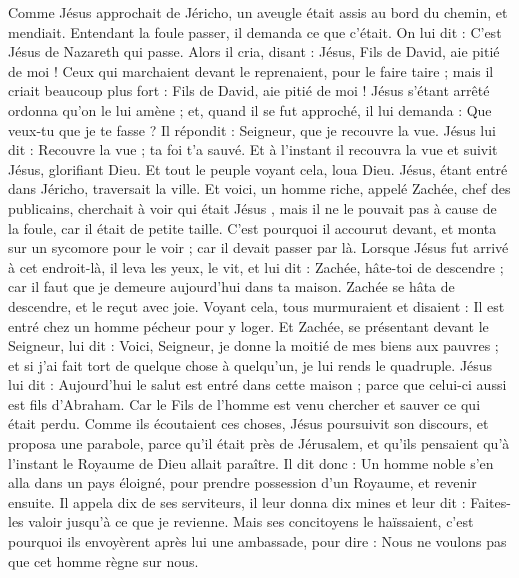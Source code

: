 \begin{multicols}{2}
{
Comme Jésus approchait de Jéricho, un aveugle était assis au bord du chemin, et mendiait.
Entendant la foule passer, il demanda ce que c'était.
On lui dit : C’est Jésus de Nazareth qui passe.
Alors il cria, disant : Jésus, Fils de David, aie pitié de moi !
Ceux qui marchaient devant le reprenaient, pour le faire taire ; mais il criait beaucoup plus fort : Fils de David, aie pitié de moi !
Jésus s'étant arrêté ordonna qu'on le lui amène ; et, quand il se fut approché,
il lui demanda : Que veux-tu que je te fasse ? Il répondit : Seigneur, que je recouvre la vue.
Jésus lui dit : Recouvre la vue ; ta foi t'a sauvé.
Et à l'instant il recouvra la vue et suivit Jésus, glorifiant Dieu. Et tout le peuple voyant cela, loua Dieu.
\VerseOne{}Jésus, étant entré dans Jéricho, traversait la ville.
Et voici, un homme riche, appelé Zachée, chef des publicains, cherchait à voir qui était Jésus ,
mais il ne le pouvait pas à cause de la foule, car il était de petite taille.
C'est pourquoi il accourut devant, et monta sur un sycomore pour le voir ; car il devait passer par là.
Lorsque Jésus fut arrivé à cet endroit-là, il leva les yeux, le vit, et lui dit : Zachée, hâte-toi de descendre ; car il faut que je demeure aujourd'hui dans ta maison.
Zachée se hâta de descendre, et le reçut avec joie.
Voyant cela, tous murmuraient et disaient : Il est entré chez un homme pécheur pour y loger.
Et Zachée, se présentant devant le Seigneur, lui dit : Voici, Seigneur, je donne la moitié de mes biens aux pauvres ; et si j'ai fait tort de quelque chose à quelqu'un, je lui rends le quadruple.
Jésus lui dit : Aujourd'hui le salut est entré dans cette maison ; parce que celui-ci aussi est fils d'Abraham.
Car le Fils de l'homme est venu chercher et sauver ce qui était perdu.
Comme ils écoutaient ces choses, Jésus poursuivit son discours, et proposa une parabole, parce qu'il était près de Jérusalem, et qu'ils pensaient qu'à l'instant le Royaume de Dieu allait paraître.
Il dit donc : Un homme noble s'en alla dans un pays éloigné, pour prendre possession d'un Royaume, et revenir ensuite.
Il appela dix de ses serviteurs, il leur donna dix mines et leur dit : Faites-les valoir jusqu'à ce que je revienne.
Mais ses concitoyens le haïssaient, c'est pourquoi ils envoyèrent après lui une ambassade, pour dire : Nous ne voulons pas que cet homme règne sur nous.
}
\end{multicols}
